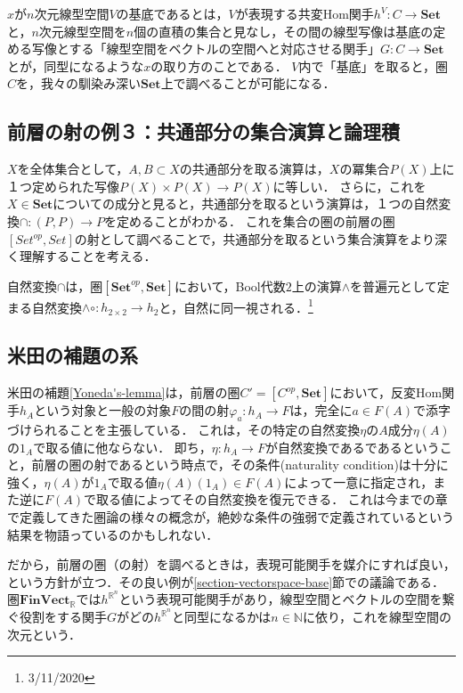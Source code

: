 \documentclass[uplatex, dvipdfmx]{jsreport}
\begin{document}
\begin{screen}
    $x$が$n$次元線型空間$V$の基底であるとは，$V$が表現する共変Hom関手$h^V:C\to\mathbf{Set}$と，$n$次元線型空間を$n$個の直積の集合と見なし，その間の線型写像は基底の定める写像とする「線型空間をベクトルの空間へと対応させる関手」$G:C\to\mathbf{Set}$とが，同型になるような$x$の取り方のことである．
    $V$内で「基底」を取ると，圏$C$を，我々の馴染み深い$\mathbf{Set}$上で調べることが可能になる．
\end{screen}

\subsection{前層の射の例３：共通部分の集合演算と論理積}

$X$を全体集合として，$A,B\subset X$の共通部分を取る演算は，$X$の冪集合$P(X)$上に１つ定められた写像$P(X)\times P(X)\to P(X)$に等しい．
さらに，これを$X\in\mathbf{Set}$についての成分と見ると，共通部分を取るという演算は，１つの自然変換$\cap :(P,P)\to P$を定めることがわかる．
これを集合の圏の前層の圏$[Set^{op},Set]$の射として調べることで，共通部分を取るという集合演算をより深く理解することを考える．

\begin{screen}\rm{}
    自然変換$\cap$は，圏$[\mathbf{Set}^{op}, \mathbf{Set}]$において，Bool代数$2$上の演算$\wedge$を普遍元として定まる自然変換$\wedge\circ :h_{2\times 2}\to h_2$と，自然に同一視される．\footnote{3/11/2020}
\end{screen}

\subsection{米田の補題の系}

米田の補題\ref{Yoneda's-lemma}は，前層の圏$C'=[C^{op},\mathbf{Set}]$において，反変Hom関手$h_A$という対象と一般の対象$F$の間の射$\varphi_a:h_A\to F$は，完全に$a\in F(A)$で添字づけられることを主張している．
これは，その特定の自然変換$\eta$の$A$成分$\eta(A)$の$1_A$で取る値に他ならない．
即ち，$\eta:h_A\to F$が自然変換であるであるということ，前層の圏の射であるという時点で，その条件(naturality condition)は十分に強く，$\eta(A)$が$1_A$で取る値$\eta(A)(1_A)\in F(A)$によって一意に指定され，また逆に$F(A)$で取る値によってその自然変換を復元できる．
これは今までの章で定義してきた圏論の様々の概念が，絶妙な条件の強弱で定義されているという結果を物語っているのかもしれない．

だから，前層の圏（の射）を調べるときは，表現可能関手を媒介にすれば良い，という方針が立つ．その良い例が\ref{section-vectorspace-base}節での議論である．圏$\mathbf{FinVect}_\mathbb{R}$では$h^{\mathbb{R}^n}$という表現可能関手があり，線型空間とベクトルの空間を繋ぐ役割をする関手$G$がどの$h^{\mathbb{R}^n}$と同型になるかは$n\in\mathbb{N}$に依り，これを線型空間の次元という．
\end{document}

